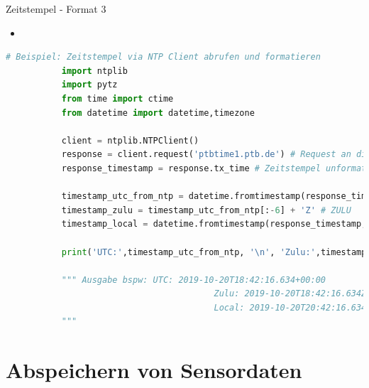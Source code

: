 \begin{frame}[fragile]{Zeitstempel - Format 3}
    \begin{itemize}
        \setlength{\itemindent}{2.4in}
        \item [\textbf{}]
    \end{itemize}

  \begin{lstlisting}[language=Python, gobble=8]
        # Beispiel: Zeitstempel via NTP Client abrufen und formatieren
           import ntplib
           import pytz
           from time import ctime
           from datetime import datetime,timezone

           client = ntplib.NTPClient()
           response = client.request('ptbtime1.ptb.de') # Request an die Physikalisch Technische Bundesanstalt (PTB) in Braunschweig
           response_timestamp = response.tx_time # Zeitstempel unformatiert als float

           timestamp_utc_from_ntp = datetime.fromtimestamp(response_timestamp, timezone.utc).isoformat(timespec='milliseconds') # UTC
           timestamp_zulu = timestamp_utc_from_ntp[:-6] + 'Z' # ZULU
           timestamp_local = datetime.fromtimestamp(response_timestamp, pytz.timezone('Europe/Berlin')).isoformat(timespec='milliseconds') # +2 Stunden Offset

           print('UTC:',timestamp_utc_from_ntp, '\n', 'Zulu:',timestamp_zulu, '\n', 'Local:',timestamp_local)

           """ Ausgabe bspw: UTC: 2019-10-20T18:42:16.634+00:00
                                         Zulu: 2019-10-20T18:42:16.634Z
                                         Local: 2019-10-20T20:42:16.634+02:00
           """
        \end{lstlisting}

\end{frame}


\section{Abspeichern von Sensordaten}

